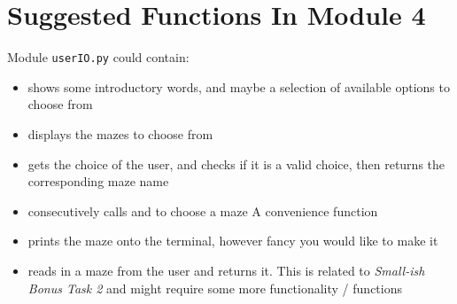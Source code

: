 \section{Suggested Functions In  Module 4}
Module \texttt{userIO.py} could contain:
\begin{itemize}
	\item {} shows some introductory words, and maybe a
	      selection of available options to choose from
	\item {} displays the mazes to choose from
	\item {} gets the choice of the user, and
	      checks if it is a valid choice, then returns the corresponding maze name
	\item {} consecutively calls
	       and  to choose a maze
	      A convenience function
	\item {} prints the maze onto the terminal, however
	      fancy you would like to make it
	\item {} reads in a maze from the user and returns it.
	      This is related to \emph{Small-ish Bonus Task 2} and might require some more
	      functionality / functions
\end{itemize}

